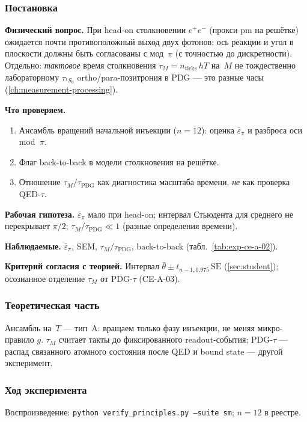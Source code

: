\label{exp:cea02}

\subsubsection*{Постановка}
\textbf{Физический вопрос.}
При head-on столкновении $e^+e^-$ (прокси pm на решётке) ожидается почти противоположный выход двух фотонов: ось реакции и угол в плоскости должны быть согласованы с мод~$\pi$ (с точностью до дискретности).
Отдельно: \emph{тактовое} время столкновения $\tau_M=n_{\mathrm{ticks}}\,hT$ на~$M$ не тождественно лабораторному $\tau_{^1S_0}$ ortho/para-позитрония в PDG --- это разные часы (\cref{ch:measurement-processing}).

\textbf{Что проверяем.}
\begin{enumerate}[label=\textbf{(\alph*)},leftmargin=*,itemsep=0.25em]
\item Ансамбль вращений начальной инъекции ($n=12$): оценка $\bar\varepsilon_\pi$ и разброса оси mod~$\pi$.
\item Флаг back-to-back в модели столкновения на решётке.
\item Отношение $\tau_M/\tau_{\mathrm{PDG}}$ как диагностика масштаба времени, \emph{не} как проверка QED-$\tau$.
\end{enumerate}

\textbf{Рабочая гипотеза.}
$\bar\varepsilon_\pi$ мало при head-on; интервал Стьюдента для среднего не перекрывает $\pi/2$; $\tau_M/\tau_{\mathrm{PDG}}\ll 1$ (разные определения времени).

\textbf{Наблюдаемые.}
$\bar\varepsilon_\pi$, SEM, $\tau_M/\tau_{\mathrm{PDG}}$, back-to-back (табл.~\ref{tab:exp-ce-a-02}).

\textbf{Критерий согласия с теорией.}
Интервал $\bar\theta\pm t_{n-1,0.975}\,\mathrm{SE}$ (\cref{sec:student}); осознанное отделение $\tau_M$ от PDG-$\tau$ (CE-A-03).

\subsubsection*{Теоретическая часть}
Ансамбль на~$T$ --- тип~A: вращаем только фазу инъекции, не меняя микро-правило $g$.
$\tau_M$ считает такты до фиксированного readout-события; PDG-$\tau$ --- распад связанного атомного состояния после QED и bound state --- другой эксперимент.

\subsubsection*{Ход эксперимента}
Воспроизведение: \texttt{python verify\_principles.py --suite sm}; $n=12$ в реестре.

